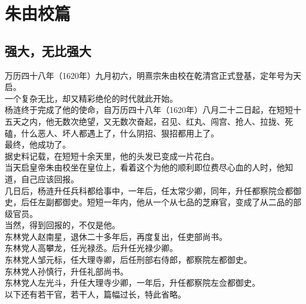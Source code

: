 \chapter*{朱由校篇}
\section{强大，无比强大}
\ifnum{}
	\begin{multicols}{\theparacolNo}
\fi
万历四十八年（1620年）九月初六，明熹宗朱由校在乾清宫正式登基，定年号为天启。\\

一个复杂无比，却又精彩绝伦的时代就此开始。\\

杨涟终于完成了他的使命，自万历四十八年（1620年）八月二十二日起，在短短十五天之内，他无数次绝望，又无数次奋起，召见、红丸、闯宫、抢人、拉拢、死磕，什么恶人、坏人都遇上了，什么阴招、狠招都用上了。\\

最终，他成功了。\\

据史料记载，在短短十余天里，他的头发已变成一片花白。\\

当天启皇帝朱由校坐在皇位上，看着这个为他的顺利即位费尽心血的人时，他知道，自己应该回报。\\

几日后，杨涟升任兵科都给事中，一年后，任太常少卿，同年，升任都察院佥都御史，后任左副都御史。短短一年内，他从一个从七品的芝麻官，变成了从二品的部级官员。\\

当然，得到回报的，不仅是他。\\

东林党人赵南星，退休二十多年后，再度复出，任吏部尚书。\\

东林党人高攀龙，任光禄丞。后升任光禄少卿。\\

东林党人邹元标，任大理寺卿，后任刑部右侍郎，都察院左都御史。\\

东林党人孙慎行，升任礼部尚书。\\

东林党人左光斗，升任大理寺少卿，一年后，升任都察院左佥都御史。\\

以下还有若干官，若干人，篇幅过长，特此省略。\\


\end{multicols}
